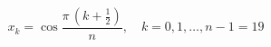 \documentclass[preview,10pt,border=8pt]{standalone}
\begin{document}
	\begin{equation}
		x_k = \cos
			\frac{\pi\,(k + \tfrac{1}{2})}{n},\quad
		k = 0,1,\dots,n-1 = 19
	\end{equation}
\morewhite
\end{document}
